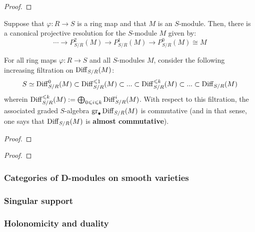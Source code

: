                 \begin{proof}
                    
                \end{proof}
            \begin{corollary} \label{coro: canonical_projective_resolutions_for_modules_of_differential_operators}
                Suppose that $\varphi:  R \to S$ is a ring map and that $M$ is an $S$-module. Then, there is a canonical projective resolution for the $S$-module $M$ given by:
                    $$\cdots \to P_{S/R}^2(M) \to P_{S/R}^1(M) \to P_{S/R}^0(M) \cong M$$
            \end{corollary}
            
            \begin{lemma} \label{lemma: rings_of_differential_operators_are_almost_commutative}
                For all ring maps $\varphi: R \to S$ and all $S$-modules $M$, consider the following increasing filtration on $\mathrm{Diff}_{S/R}(M)$:
                    $$S \simeq \mathrm{Diff}_{S/R}^0(M) \subset \mathrm{Diff}_{S/R}^{\leqslant 1}(M) \subset ... \subset \mathrm{Diff}_{S/R}^{\leqslant k}(M) \subset ... \subset \mathrm{Diff}_{S/R}(M)$$
                wherein $\mathrm{Diff}_{S/R}^{\leqslant k}(M) := \bigoplus_{0 \leqslant i \leqslant k} \mathrm{Diff}_{S/R}^i(M)$. With respect to this filtration, the associated graded $S$-algebra $\operatorname{gr}_{\bullet} \mathrm{Diff}_{S/R}(M)$ is commutative (and in that sense, one says that $\mathrm{Diff}_{S/R}(M)$ is \textbf{almost commutative}).
            \end{lemma}
                \begin{proof}
                    
                \end{proof}
            \begin{proposition}
                
            \end{proposition}
                \begin{proof}
                    
                \end{proof}
    
        \subsubsection{Categories of D-modules on smooth varieties}
        
        \subsubsection{Singular support}
        
        \subsubsection{Holonomicity and duality}